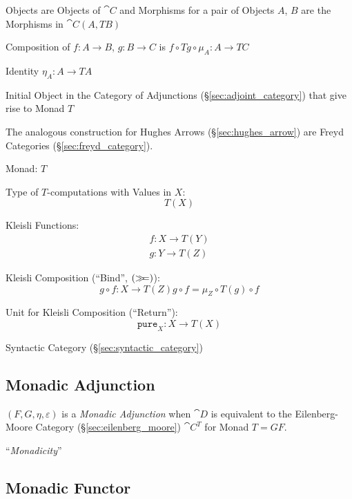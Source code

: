Objects are Objects of $\cat{C}$ and Morphisms for a pair of
Objects $A$, $B$ are the Morphisms in $\cat{C}(A, T B)$

Composition of $f : A \rightarrow B$, $g : B \rightarrow C$ is $f
\circ T g \circ \mu_A : A \rightarrow TC$

Identity $\eta_A : A \rightarrow T A$

Initial Object in the Category of Adjunctions
(\S\ref{sec:adjoint_category}) that give rise to Monad $T$

The analogous construction for Hughes Arrows
(\S\ref{sec:hughes_arrow}) are Freyd Categories
(\S\ref{sec:freyd_category}).

Monad: $T$

Type of $T$-computations with Values in $X$:
\[
  T (X)
\]

Kleisli Functions:
\[
\begin{split}
  f : X \rightarrow T(Y) \\
  g : Y \rightarrow T(Z)
\end{split}
\]

Kleisli Composition (``Bind'', $\mathtt{(\mathsf{\gg\kern-3pt=})}$):
\[
  g \circ f : X \rightarrow T(Z)
  g \circ f = \mu_Z \circ T(g) \circ f
\]

Unit for Kleisli Composition (``Return''):
\[
  \mathtt{pure}_X : X \rightarrow T (X)
\]

Syntactic Category (\S\ref{sec:syntactic_category})



\subsection{Monadic Adjunction}\label{sec:monadic_adjunction}

$(F,G,\eta,\varepsilon)$ is a \emph{Monadic Adjunction} when
$\cat{D}$ is equivalent to the Eilenberg-Moore Category
(\S\ref{sec:eilenberg_moore}) $\cat{C}^T$ for Monad $T = GF$.

``\emph{Monadicity}''



\subsection{Monadic Functor}\label{sec:monadic_functor}

